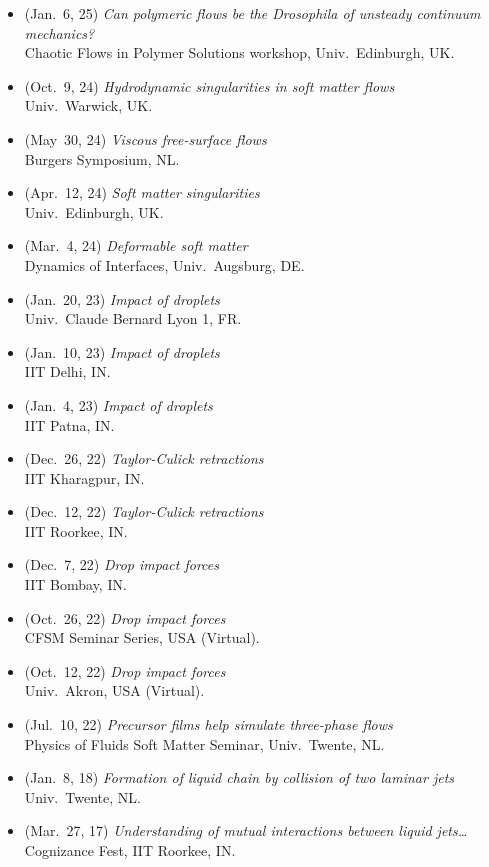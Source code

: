 \documentclass[10pt,a4paper,colorlinks,linkcolor=blue,urlcolor=blue,citecolor=blue]{moderncv}
\begin{document}
\begin{itemize}[leftmargin=1.5em]
  DAMTP, Univ.~Cambridge, UK.
\item[\textbullet] (Jan.~6, 25) \emph{Can polymeric flows be the Drosophila of unsteady continuum mechanics?} \\
  Chaotic Flows in Polymer Solutions workshop, Univ.~Edinburgh, UK.
\item[\textbullet] (Oct.~9, 24) \emph{Hydrodynamic singularities in soft matter flows} \\
  Univ.~Warwick, UK.
\item[\textbullet] (May~30, 24) \emph{Viscous free-surface flows} \\
  Burgers Symposium, NL.
\item[\textbullet] (Apr.~12, 24) \emph{Soft matter singularities} \\
  Univ.~Edinburgh, UK.
\item[\textbullet] (Mar.~4, 24) \emph{Deformable soft matter} \\
  Dynamics of Interfaces, Univ.~Augsburg, DE.
\item[\textbullet] (Jan.~20, 23) \emph{Impact of droplets} \\
  Univ.~Claude Bernard Lyon 1, FR.
\item[\textbullet] (Jan.~10, 23) \emph{Impact of droplets} \\
  IIT Delhi, IN.
\item[\textbullet] (Jan.~4, 23) \emph{Impact of droplets} \\
  IIT Patna, IN.
\item[\textbullet] (Dec.~26, 22) \emph{Taylor-Culick retractions} \\
  IIT Kharagpur, IN.
\item[\textbullet] (Dec.~12, 22) \emph{Taylor-Culick retractions} \\
  IIT Roorkee, IN.
\item[\textbullet] (Dec.~7, 22) \emph{Drop impact forces} \\
  IIT Bombay, IN.
\item[\textbullet] (Oct.~26, 22) \emph{Drop impact forces} \\
  CFSM Seminar Series, USA (Virtual). \href{https://www.youtube.com/live/enTMAucwUDs?si=Dm-IJ3A0o7AhMc2T}{\color{red}\faYoutube}
\item[\textbullet] (Oct.~12, 22) \emph{Drop impact forces} \\
  Univ.~Akron, USA (Virtual).
\item[\textbullet] (Jul.~10, 22) \emph{Precursor films help simulate three-phase flows} \\
  Physics of Fluids Soft Matter Seminar, Univ.~Twente, NL. \href{https://youtu.be/ozrnYe8u1HA?si=DA4JIFjNozmPsQuE}{\color{red}\faYoutube}
\item[\textbullet] (Jan.~8, 18) \emph{Formation of liquid chain by collision of two laminar jets} \\
  Univ.~Twente, NL.
\item[\textbullet] (Mar.~27, 17) \emph{Understanding of mutual interactions between liquid jets\ldots} \\
  Cognizance Fest, IIT Roorkee, IN.
\end{itemize}
\end{document}

